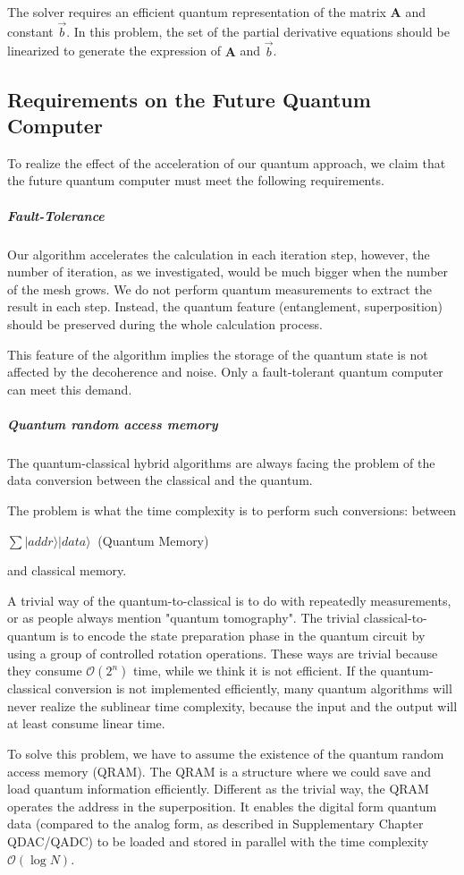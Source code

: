 \documentclass[%
 reprint,
 amsmath,amssymb,
pra,
]{revtex4-1}
\begin{document}
The solver requires an efficient quantum representation of the matrix $\bm{A}$ and constant $\vec{b}$. In this problem, the set of the partial derivative equations should be linearized to generate the expression of $\bm{A}$ and $\vec{b}$.

\subsection{Requirements on the Future Quantum Computer}

To realize the effect of the acceleration of our quantum approach, we claim that the future quantum computer must meet the following requirements.

\subparagraph{Fault-Tolerance} Our algorithm accelerates the calculation in each iteration step, however, the number of iteration, as we investigated, would be much bigger when the number of the mesh grows. We do not perform quantum measurements to extract the result in each step. Instead, the quantum feature (entanglement, superposition) should be preserved during the whole calculation process. 

This feature of the algorithm implies the storage of the quantum state is not affected by the decoherence and noise. Only a fault-tolerant quantum computer can meet this demand.

\subparagraph{Quantum random access memory} The quantum-classical hybrid algorithms are always facing the problem of the data conversion between the classical and the quantum.

The problem is what the time complexity is to perform such conversions: between
\begin{center}
$ \sum|addr\rangle|data\rangle\ $ (Quantum Memory) 
\end{center}
and classical memory.

A trivial way of the quantum-to-classical is to do with repeatedly measurements, or as people always mention "quantum tomography". The trivial classical-to-quantum is to encode the state preparation phase in the quantum circuit by using a group of controlled rotation operations. These ways are trivial because they consume $\mathcal{O}(2^n)$ time, while we think it is not efficient. If the quantum-classical conversion is not implemented efficiently, many quantum algorithms will never realize the sublinear time complexity, because the input and the output will at least consume linear time.

To solve this problem, we have to assume the existence of the quantum random access memory (QRAM). The QRAM is a structure where we could save and load quantum information efficiently. Different as the trivial way, the QRAM operates the address in the superposition. It enables the digital form quantum data (compared to the analog form, as described in Supplementary Chapter QDAC/QADC\cite{mitarai2019quantum, martin2019digital}) to be loaded and stored in parallel with the time complexity $\mathcal{O}(\log N)$.
\end{document}

